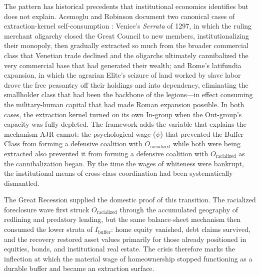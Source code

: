 The pattern has historical precedents that institutional economics identifies but does not explain. Acemoglu and Robinson document two canonical cases of extraction-kernel self-consumption \cite{acemoglu_robinson}: Venice's \textit{Serrata} of 1297, in which the ruling merchant oligarchy closed the Great Council to new members, institutionalizing their monopoly, then gradually extracted so much from the broader commercial class that Venetian trade declined and the oligarchs ultimately cannibalized the very commercial base that had generated their wealth; and Rome's latifundia expansion, in which the agrarian Elite's seizure of land worked by slave labor drove the free peasantry off their holdings and into dependency, eliminating the smallholder class that had been the backbone of the legions---in effect consuming the military-human capital that had made Roman expansion possible. In both cases, the extraction kernel turned on its own In-group when the Out-group's capacity was fully depleted. The framework adds the variable that explains the mechanism AJR cannot: the psychological wage ($\psi$) that prevented the Buffer Class from forming a defensive coalition with $O_{\text{racialized}}$ while both were being extracted also prevented it from forming a defensive coalition with $O_{\text{racialized}}$ as the cannibalization began. By the time the wages of whiteness were bankrupt, the institutional means of cross-class coordination had been systematically dismantled.

The Great Recession supplied the domestic proof of this transition. The racialized foreclosure wave first struck $O_{\text{racialized}}$ through the accumulated geography of redlining and predatory lending, but the same balance-sheet mechanism then consumed the lower strata of $I_{\text{buffer}}$: home equity vanished, debt claims survived, and the recovery restored asset values primarily for those already positioned in equities, bonds, and institutional real estate. The crisis therefore marks the inflection at which the material wage of homeownership stopped functioning as a durable buffer and became an extraction surface.

